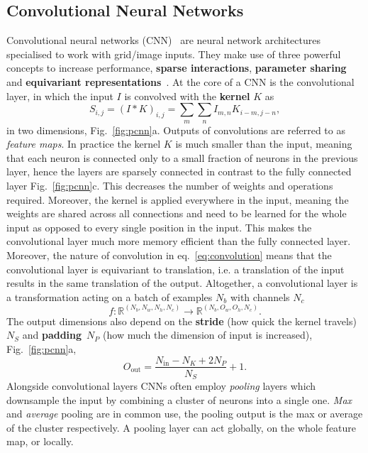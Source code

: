 \subsection{Convolutional Neural Networks}
\label{subsec:nn-cnn} 
Convolutional neural networks (CNN)~\cite{lecun1989generalization} are neural network architectures specialised to work with grid/image inputs. They make use of three powerful concepts to increase performance, \textbf{sparse interactions}, \textbf{parameter sharing} and \textbf{equivariant representations}~\cite{goodfellow2016deep}. At the core of a CNN is the {convolutional} layer, in which the input $I$ is convolved with the \textbf{kernel} $K$ as 
\begin{equation}
	\label{eq:convolution}
	S_{i,j} = (I * K)_{i,j} = \sum_m \sum_n I_{m,n} K_{i-m, j-n},
\end{equation}
in two dimensions, Fig.~\ref{fig:pcnn}a. Outputs of convolutions are referred to as \emph{feature maps}. In practice the kernel $K$ is much smaller than the input, meaning that each neuron is connected only to a small fraction of neurons in the previous layer, hence the layers are sparsely connected in contrast to the fully connected layer Fig.~\ref{fig:pcnn}c. This decreases the number of weights and operations required. Moreover, the kernel is applied everywhere in the input, meaning the weights are shared across all connections and need to be learned for the whole input as opposed to every single position in the input. This makes the convolutional layer much more memory efficient than the fully connected layer. Moreover, the nature of convolution in eq.~\eqref{eq:convolution} means that the convolutional layer is equivariant to translation, i.e. a translation of the input results in the same translation of the output. Altogether, a convolutional layer is a transformation acting on a batch of examples $N_b$ with channels $N_c$
\begin{equation}
	f: \mathbb{R}^{(N_b, N_w, N_h, N_c)} \rightarrow \mathbb{R}^{(N_b, O_w, O_h, N_c)}.
\end{equation}
The output dimensions also depend on the \textbf{stride} (how quick the kernel travels)~$N_S$ and \textbf{padding}~$N_P$ (how much the dimension of input is increased), Fig.~\ref{fig:pcnn}a,
\begin{equation}
	O_{\text{out}} = \frac{N_{\text{in}}-N_K+2N_P}{N_S}+1.
\end{equation}
Alongside convolutional layers CNNs often employ \emph{pooling} layers which downsample the input by combining a cluster of neurons into a single one. \emph{Max} and \emph{average} pooling are in common use, the pooling output is the max or average of the cluster respectively. A pooling layer can act globally, on the whole feature map, or locally. 

